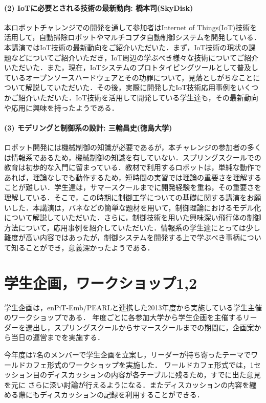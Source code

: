 \documentclass[submit]{ipsj}
\begin{document}
\paragraph*{(2) IoTに必要とされる技術の最新動向: 橋本司(SkyDisk)}

本ロボットチャレンジでの開発を通して参加者はInternet of Things(IoT)技術を活用して，自動掃除ロボットやマルチコプタ自動制御システムを開発している．本講演ではIoT技術の最新動向をご紹介いただいた．まず，IoT技術の現状の課題などについてご紹介いただき，IoT周辺の学ぶべき様々な技術についてご紹介いただいた．また，現在，IoTシステムのプロトタイピングツールとして普及しているオープンソースハードウェアとその功罪について，見落としがちなことについて解説していただいた．その後，実際に開発したIoT技術応用事例をいくつかご紹介いただいた．IoT技術を活用して開発している学生達も，その最新動向や応用に興味を持ったようである．

\paragraph*{(3) モデリングと制御系の設計: 三輪昌史(徳島大学)}

ロボット開発には機械制御の知識が必要であるが，本チャレンジの参加者の多くは情報系であるため，機械制御の知識を有していない．スプリングスクールでの教育は初歩的な入門に留まっている．教材で利用するロボットは，単純な動作であれば，理論なしでも動作するため，短時間の実習では理論の重要さを理解することが難しい．学生達は，サマースクールまでに開発経験を重ね，その重要さを理解している．そこで，この時期に制御工学についての基礎に関する講演をお願いした．本講演は，バネなどの簡単な題材を用いて，制御理論におけるモデル化について解説していただいた．さらに，制御技術を用いた興味深い飛行体の制御方法について，応用事例を紹介していただいた．情報系の学生達にとっては少し難度が高い内容ではあったが，制御システムを開発する上で学ぶべき事柄について知ることができ，意義深かったようである．

\section{学生企画，ワークショップ1,2}
学生企画は，enPiT-Emb/PEARLと連携した2013年度から実施している学生主催のワークショップである．
年度ごとに各参加大学から学生企画を主催するリーダーを選出し，スプリングスクールからサマースクールまでの期間に，企画案から当日の運営までを実施する．

今年度は7名のメンバーで学生企画を立案し，リーダーが持ち寄ったテーマでワールドカフェ形式のワークショップを実施した．
ワールドカフェ形式では，1セッション目のディスカッションの内容が各テーブルに残るため，すでに出た意見を元に
さらに深い討論が行えるようになる．またディスカッションの内容を纏める際にもディスカッションの記録を利用することができる．
\end{document}
